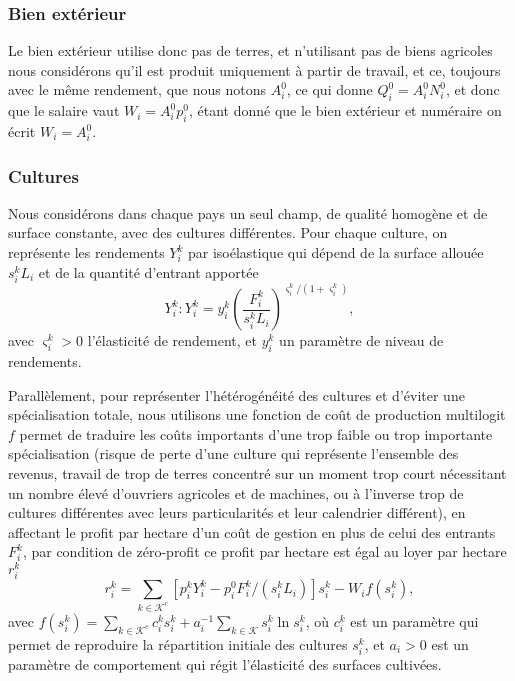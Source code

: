 \subsubsection{Bien extérieur}
Le bien extérieur utilise donc pas de terres, et n’utilisant pas de biens agricoles nous considérons qu’il est produit uniquement à partir de travail, et ce, toujours avec le même rendement, que nous notons $A_i^0$, ce qui donne $Q_i^0 = A_i^0 N_i^0$, et donc que le salaire vaut $W_i = A_i^0 p_i^0$, étant donné que le bien extérieur et numéraire on écrit $W_i=A_i^0$.

\subsubsection{Cultures}

Nous considérons dans chaque pays un seul champ, de qualité homogène et de surface constante, avec des cultures différentes. Pour chaque culture, on représente les rendements $Y_i^k$ par isoélastique qui dépend de la surface allouée $s_i^k L_i$ et de la quantité d’entrant apportée
\begin{equation}\label{eq_yik}
	Y_i^k: Y_i^k = y_i^k \left( \frac{F_i^k}{s_i^k L_i} \right) ^{\varsigma_i^k/(1+\varsigma_i^k)},
\end{equation}
avec $\varsigma_i^k > 0$ l’élasticité de rendement, et $y_i^k$ un paramètre de niveau de rendements.

Parallèlement, pour représenter l’hétérogénéité des cultures et d’éviter une spécialisation totale, nous utilisons une fonction de coût de production multilogit $f$ permet de traduire les coûts importants d’une trop faible ou trop importante spécialisation (risque de perte d’une culture qui représente l’ensemble des revenus, travail de trop de terres concentré sur un moment trop court nécessitant un nombre élevé d’ouvriers agricoles et de machines, ou à l’inverse trop de cultures différentes avec leurs particularités et leur calendrier différent), en affectant le profit par hectare d’un coût de gestion en plus de celui des entrants $F_i^k$, par condition de zéro-profit ce profit par hectare est égal au loyer par hectare $r_i^k$
\begin{equation}\label{eq_rik}
	r_i^k = \sum_{k \in \mathcal{K}^c} [p_i^k Y_i^k - p_i^0 F_i^k/(s_i^k L_i)]s_i^k - W_i f(s_i^k),
\end{equation}
avec $f(s_i^k) = \sum_{k \in \mathcal{K}^c} c_i^k s_i^k + a_i^{-1} \sum_{k \in \mathcal{K}} s_i^k \ln s_i^k$, où $c_i^k$ est un paramètre qui permet de reproduire la répartition initiale des cultures $s_i^k$, et $a_i > 0$ est un paramètre de comportement qui régit l’élasticité des surfaces cultivées.

